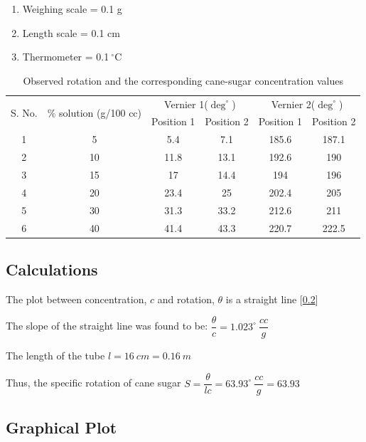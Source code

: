 \documentclass{dkpinto-report}
\begin{document}
\begin{enumerate}
\item Weighing scale = 0.1 g
\item Length scale = 0.1 cm
\item Thermometer = 0.1$\ ^{\circ}$C
\end{enumerate}


\begin{table}[ht]
\caption{Observed rotation and the corresponding cane-sugar concentration values}
\centering
\begin{tabular}{|c|c|c|c|c|c|}
\hline
\multirow{2}{*}{S. No.}  &  \multirow{2}{*}{$\%$ solution (g/100 cc)} &  \multicolumn{2}{c|}{Vernier 1($\deg^{\circ}$)}  &  \multicolumn{2}{c|}{Vernier 2($\deg^{\circ}$)} \\ \cline{3-6}
  &     &  Position 1  &  Position 2 &  Position 1  &  Position 2 \\
\hline 
1  & 5  & 5.4  &  7.1  &  185.6 &  187.1\\
\hline
2  &  10  &  11.8  &  13.1  &  192.6   &  190 \\
\hline
3  &  15  &  17  &  14.4  &  194  &  196  \\
\hline
4  &  20  &  23.4  &  25  &  202.4  &  205  \\
\hline
5  &  30  &  31.3  &  33.2  &  212.6  &  211  \\
\hline
6 & 40  &  41.4  &  43.3  &  220.7  & 222.5  \\
\hline
\end{tabular}
\end{table}


\subsection{Calculations}
The plot between concentration, $c$ and rotation, $\theta$ is a straight line [\ref{subsec:gp}] 

The slope of the straight line was found to be: $\dfrac{\theta}{c} = 1.023^{\circ}\ \dfrac{cc}{g}$

The length of the tube $l = 16\ cm = 0.16\ m$

Thus, the specific rotation of cane sugar $S = \dfrac{\theta}{lc} = 63.93^{\circ}\ \dfrac{cc}{g} = 63.93$  

\subsection{Graphical Plot} \label{subsec:gp}
\end{document}
